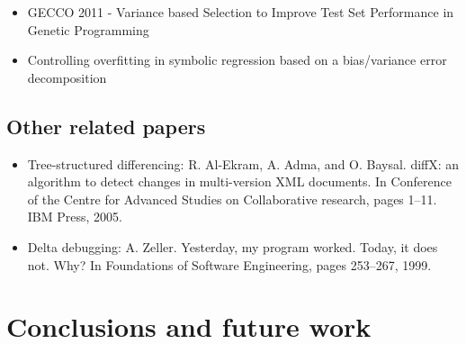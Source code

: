 \begin{itemize}
\item
GECCO 2011 - Variance based Selection to Improve Test Set Performance in Genetic Programming

\item
Controlling overfitting in symbolic regression based on a bias/variance error decomposition


\end{itemize}

\subsection{Other related papers}

\begin{itemize}
\item
Tree-structured differencing: R. Al-Ekram, A. Adma, and O. Baysal. diffX: an algorithm to detect changes in multi-version XML documents. In Conference of the Centre for Advanced Studies on Collaborative research, pages 1–11. IBM Press, 2005.

\item
Delta debugging: A. Zeller. Yesterday, my program worked. Today, it does not. Why? In Foundations of Software Engineering, pages 253–267, 1999.

\end{itemize}

\section{Conclusions and future work}
\label{sec:conclusions}


\begin{acks}
  

\end{acks}
